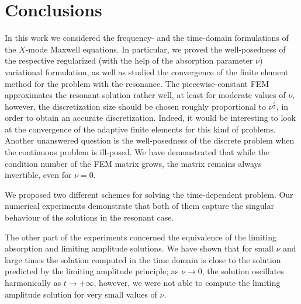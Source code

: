 \section{Conclusions}
In this work we considered the frequency- and the time-domain formulations of the $X$-mode Maxwell equations. 
In particular, we proved the well-posedness of the respective regularized (with the help of 
the absorption parameter $\nu$) variational formulation, as 
well as studied the convergence of the finite element method for the problem with the resonance. 
The piecewise-constant FEM approximates the resonant solution rather well, at least for moderate values of $\nu$, 
however, the discretization size should be chosen roughly proportional to $\nu^{\frac{3}{2}}$, in order to obtain an accurate discretization.
Indeed, it would be interesting to look at the convergence of the adaptive finite elements for this kind of problems. 
Another unanswered question is the well-posedness of the discrete problem when the continuous problem is ill-posed. We have 
demonstrated that while the condition number of the FEM matrix grows, the matrix remains always invertible, even for $\nu=0$. 

We proposed two different schemes for solving the time-dependent problem. Our numerical experiments demonstrate that both of them capture the singular behaviour of the solutions in the resonant case.

The other part of the experiments concerned the equivalence of the limiting absorption and limiting amplitude solutions. We have shown 
that for small $\nu$ and large times the solution computed in the time domain is close to the solution predicted by the limiting amplitude principle; as 
$\nu\rightarrow 0$, the solution oscillates harmonically as $t\rightarrow +\infty$, however, we were not able to compute the limiting amplitude solution for very 
small values of $\nu$. 